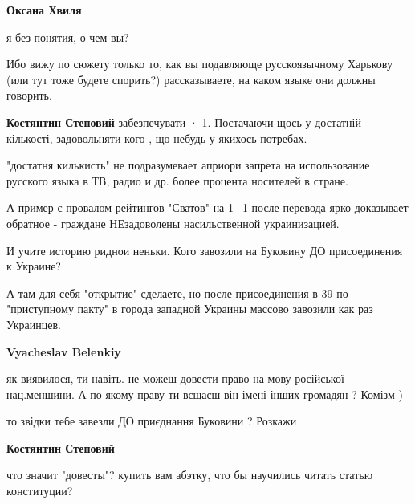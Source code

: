 \begin{itemize}
\begin{itemize}
\textbf{Оксана Хвиля} 

я без понятия, о чем вы?

Ибо вижу по сюжету только то, как вы подавляюще русскоязычному Харькову (или
тут тоже будете спорить?) рассказываете, на каком языке они должны говорить.

 
\textbf{Костянтин Степовий}
забезпечувати · 1. Постачаючи щось у достатній кількості, задовольняти кого-, що-небудь у якихось потребах.

"достатня килькисть" не подразумевает априори запрета на использование русского
языка в ТВ, радио и др. более процента носителей в стране.

А пример с провалом рейтингов "Сватов" на 1+1 после перевода ярко доказывает
обратное - граждане НЕзадоволены насильственной украинизацией.

И учите историю риднои неньки. Кого завозили на Буковину ДО присоединения к
Украине?

А там для себя "открытие" сделаете, но после присоединения в 39 по "приступному
пакту" в города западной Украины массово завозили как раз Украинцев.

 
\textbf{Vyacheslav Belenkiy} 

як виявилося, ти навіть. не можеш довести право на мову російської нац.меншини.
А по якому праву ти вєщаєш він імені інших громадян ? Комізм )

то звідки тебе завезли ДО приєднання Буковини ? Розкажи

 
\textbf{Костянтин Степовий}

что значит "довесты"? купить вам абэтку, что бы научились читать статью конституции?


\end{itemize}
\end{itemize}

